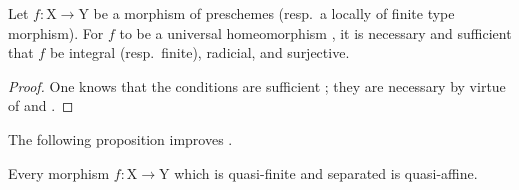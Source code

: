 \begin{corollary}[18.12.11]
\label{IV.18.12.11}
Let $f:\mathrm{X}\to\mathrm{Y}$ be a morphism of preschemes (resp.\ a locally of finite type morphism).
For $f$ to be a universal homeomorphism , it is necessary and sufficient that $f$ be integral (resp.\ finite), radicial, and surjective.
\end{corollary}

\begin{proof}
One knows that the conditions are sufficient ; they are necessary by virtue of  and .
\end{proof}

The following proposition improves .

\begin{proposition}[18.12.12]
\label{IV.18.12.12}
Every morphism $f:\mathrm{X}\to\mathrm{Y}$ which is quasi-finite and separated is quasi-affine.
\end{proposition}

